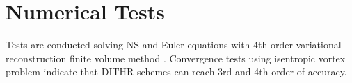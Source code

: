 \documentclass[10pt]{article}
\newcommand{\uu}{\overline{\mathbf{U}}}
\newcommand{\R}{\mathbf{R}}
\newcommand{\inc}{\mathrm\Delta}
\newcommand{\Tau}{\mathrm{T}}
\renewcommand{\Res}{\mathcal{R}}
\newcommand{\eye}{\mathbf{I}}
\begin{document}

\section{Numerical Tests}

Tests are conducted solving NS and Euler equations with 4th order variational
reconstruction finite volume method \cite{wang2017compact_VR}. 
Convergence tests using isentropic vortex problem 
indicate that DITHR schemes can reach 3rd and 4th order
of accuracy. 
\end{document}

